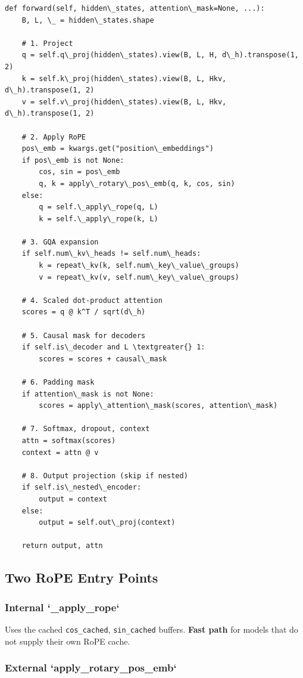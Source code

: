 \begin{lstlisting}
def forward(self, hidden\_states, attention\_mask=None, ...):
    B, L, \_ = hidden\_states.shape
    
    # 1. Project
    q = self.q\_proj(hidden\_states).view(B, L, H, d\_h).transpose(1, 2)
    k = self.k\_proj(hidden\_states).view(B, L, Hkv, d\_h).transpose(1, 2)
    v = self.v\_proj(hidden\_states).view(B, L, Hkv, d\_h).transpose(1, 2)
    
    # 2. Apply RoPE
    pos\_emb = kwargs.get("position\_embeddings")
    if pos\_emb is not None:
        cos, sin = pos\_emb
        q, k = apply\_rotary\_pos\_emb(q, k, cos, sin)
    else:
        q = self.\_apply\_rope(q, L)
        k = self.\_apply\_rope(k, L)
    
    # 3. GQA expansion
    if self.num\_kv\_heads != self.num\_heads:
        k = repeat\_kv(k, self.num\_key\_value\_groups)
        v = repeat\_kv(v, self.num\_key\_value\_groups)
    
    # 4. Scaled dot-product attention
    scores = q @ k^T / sqrt(d\_h)
    
    # 5. Causal mask for decoders
    if self.is\_decoder and L \textgreater{} 1:
        scores = scores + causal\_mask
    
    # 6. Padding mask
    if attention\_mask is not None:
        scores = apply\_attention\_mask(scores, attention\_mask)
    
    # 7. Softmax, dropout, context
    attn = softmax(scores)
    context = attn @ v
    
    # 8. Output projection (skip if nested)
    if self.is\_nested\_encoder:
        output = context
    else:
        output = self.out\_proj(context)
    
    return output, attn
\end{lstlisting}

\subsection{Two RoPE Entry Points}

\subsubsection{Internal `\_apply\_rope`}

Uses the cached \texttt{cos\_cached}, \texttt{sin\_cached} buffers. \textbf{Fast path} for models 
that do not supply their own RoPE cache.

\subsubsection{External `apply\_rotary\_pos\_emb`}

